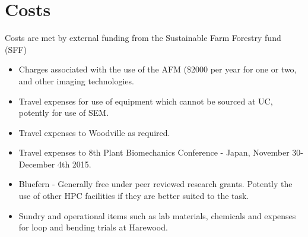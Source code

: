 \section{Costs}
Costs are met by external funding from the Sustainable Farm Forestry fund (SFF)
\begin{itemize}
\item Charges associated with the use of the AFM (\$2000 per year for one or two, and other imaging technologies.
\end{itemize}

\begin{itemize}
\item Travel expenses for use of equipment which cannot be sourced at UC, potently for
use of SEM.
\end{itemize}

\begin{itemize}
\item Travel expenses to Woodville as required.
\end{itemize}
\begin{itemize}
\item Travel expenses to 8th Plant Biomechanics Conference - Japan, November
30-December 4th 2015.
\end{itemize}

\begin{itemize}
\item Bluefern - Generally free under peer reviewed research grants. Potently the use
of other HPC facilities if they are better suited to the task.
\end{itemize}

\begin{itemize}
\item Sundry and operational items such as lab materials, chemicals and expenses for
loop and bending trials at Harewood.
\end{itemize}
